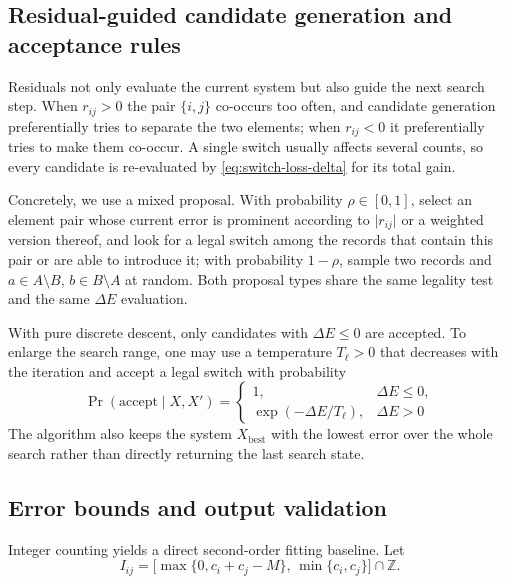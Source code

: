 \documentclass[11pt,a4paper]{article}
\numberwithin{equation}{section}
\theoremstyle{definition}
\numberwithin{algorithm}{section}
\begin{document}
\subsection{Residual-guided candidate generation and acceptance rules}\label{subsec:baseline-proposal}

Residuals not only evaluate the current system but also guide the next search step.
When $r_{ij}>0$ the pair $\{i,j\}$ co-occurs too often, and candidate generation
preferentially tries to separate the two elements;
when $r_{ij}<0$ it preferentially tries to make them co-occur.
A single switch usually affects several counts, so every candidate is re-evaluated by
\eqref{eq:switch-loss-delta} for its total gain.

Concretely, we use a mixed proposal.
With probability $\rho\in[0,1]$, select an element pair whose current error is prominent
according to $\lvert r_{ij}\rvert$ or a weighted version thereof, and look for a legal
switch among the records that contain this pair or are able to introduce it;
with probability $1-\rho$, sample two records and $a\in A\setminus B$,
$b\in B\setminus A$ at random.
Both proposal types share the same legality test and the same $\Delta E$ evaluation.

With pure discrete descent, only candidates with $\Delta E\le0$ are accepted.
To enlarge the search range, one may use a temperature $T_\ell>0$ that decreases with the
iteration and accept a legal switch with probability
\begin{equation}
\Pr(\mathrm{accept}\mid X,X')=
\begin{cases}
1,&\Delta E\le0,\\
\exp(-\Delta E/T_\ell),&\Delta E>0
\end{cases}
\label{eq:baseline-annealing}
\end{equation}
The algorithm also keeps the system $X_{\mathrm{best}}$ with the lowest error over the whole
search rather than directly returning the last search state.

\subsection{Error bounds and output validation}\label{subsec:baseline-properties}

Integer counting yields a direct second-order fitting baseline.
Let
\begin{equation}
I_{ij}=
\bigl[\max\{0,c_i+c_j-M\},\,\min\{c_i,c_j\}\bigr]\cap\mathbb Z.
\label{eq:baseline-pair-range}
\end{equation}
\end{document}
